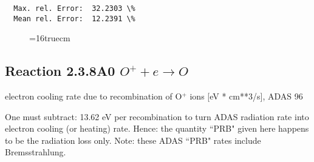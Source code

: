\documentclass[12pt,dvipdfmx]{article}
\begin{document}
\begin{small}
\begin{verbatim}
  Max. rel. Error:  32.2303 \%
  Mean rel. Error:  12.2391 \%

\end{verbatim}\end{small}
\begin{figure} \label{2.3.7rl}
\epsfxsize=16truecm 
\end{figure}
\newpage

\subsection{
  Reaction 2.3.8A0  $O^+ + e \rightarrow O   $
}
electron cooling rate due to recombination of O$^+$ ions [eV *
cm**3/s], ADAS 96

One must subtract: 13.62 eV per recombination to turn ADAS radiation
rate into electron cooling (or heating) rate. Hence: the quantity
``PRB" given here happens to be the radiation loss only. Note: these
ADAS ``PRB" rates include Bremsstrahlung.
\end{document}
